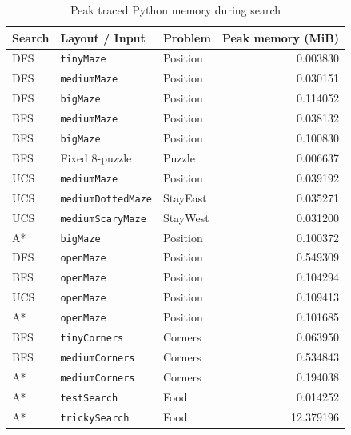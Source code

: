 \documentclass[11pt]{article}
\begin{document}
\begin{table}[htbp]
\centering
\caption{Peak traced Python memory during search}
\label{tab:search-memory}
\small
\renewcommand{\arraystretch}{1.15}
\begin{tabular}{lllr}
\hline
\textbf{Search} & \textbf{Layout / Input} & \textbf{Problem} & \textbf{Peak memory (MiB)} \\
\hline
DFS & \texttt{tinyMaze}         & Position & 0.003830 \\
DFS & \texttt{mediumMaze}       & Position & 0.030151 \\
DFS & \texttt{bigMaze}          & Position & 0.114052 \\
BFS & \texttt{mediumMaze}       & Position & 0.038132 \\
BFS & \texttt{bigMaze}          & Position & 0.100830 \\
BFS & Fixed 8-puzzle            & Puzzle   & 0.006637 \\
UCS & \texttt{mediumMaze}       & Position & 0.039192 \\
UCS & \texttt{mediumDottedMaze} & StayEast & 0.035271 \\
UCS & \texttt{mediumScaryMaze}  & StayWest & 0.031200 \\
A*  & \texttt{bigMaze}          & Position & 0.100372 \\
DFS & \texttt{openMaze}         & Position & 0.549309 \\
BFS & \texttt{openMaze}         & Position & 0.104294 \\
UCS & \texttt{openMaze}         & Position & 0.109413 \\
A*  & \texttt{openMaze}         & Position & 0.101685 \\
BFS & \texttt{tinyCorners}      & Corners  & 0.063950 \\
BFS & \texttt{mediumCorners}    & Corners  & 0.534843 \\
A*  & \texttt{mediumCorners}    & Corners  & 0.194038 \\
A*  & \texttt{testSearch}       & Food     & 0.014252 \\
A*  & \texttt{trickySearch}     & Food     & 12.379196 \\
\hline
\end{tabular}
\end{table}
\end{document}
